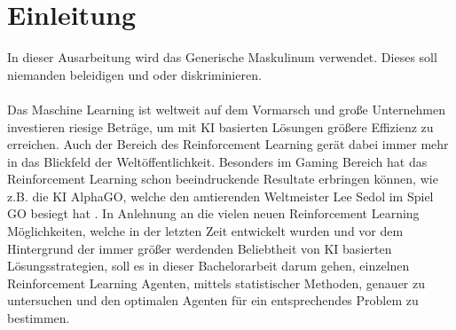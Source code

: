 \chapter{Einleitung}\label{chap:Einleitung}
In dieser Ausarbeitung wird das Generische Maskulinum verwendet. Dieses soll niemanden beleidigen und oder diskriminieren.\\
\\Das Maschine Learning ist weltweit auf dem Vormarsch und große Unternehmen investieren riesige Beträge, um mit KI basierten Lösungen größere Effizienz zu erreichen. Auch der Bereich des Reinforcement Learning gerät dabei immer mehr in das Blickfeld der Weltöffentlichkeit. Besonders im Gaming Bereich hat das Reinforcement Learning schon beeindruckende Resultate erbringen können, wie z.B. die KI AlphaGO, welche den amtierenden Weltmeister Lee Sedol im Spiel GO besiegt hat \citep{UAV}. In Anlehnung an die vielen neuen Reinforcement Learning Möglichkeiten, welche in der letzten Zeit entwickelt wurden und vor dem Hintergrund der immer größer werdenden Beliebtheit von KI basierten Lösungsstrategien, soll es in dieser Bachelorarbeit darum gehen, einzelnen Reinforcement Learning Agenten, mittels statistischer Methoden, genauer zu untersuchen und den optimalen Agenten für ein entsprechendes Problem zu bestimmen.

